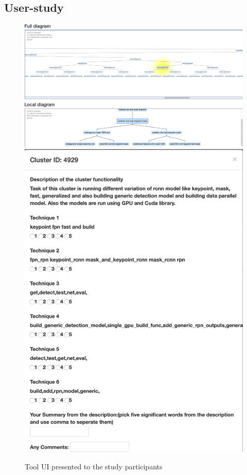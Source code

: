 \subsection{User-study}

\begin{figure}
    \begin{center}
    {\includegraphics[scale=0.25]{figures/hla1/ToolUI.png}}
    {\includegraphics[scale=0.23]{figures/hla1/userstudy.png}}
    \caption{Tool UI presented to the study participants}
    \label{fig:tool}
    \end{center}
    
\end{figure}


